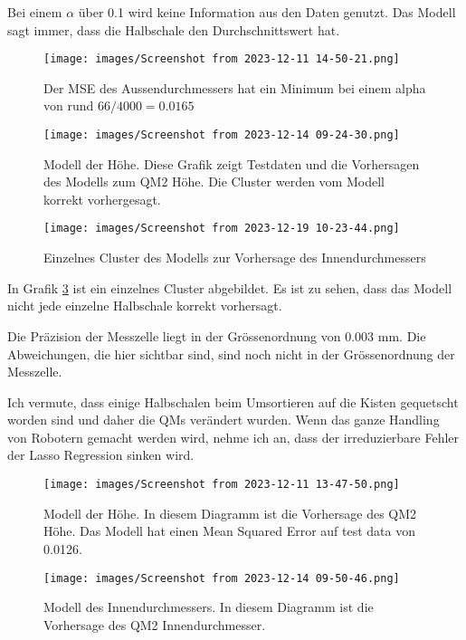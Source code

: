 Bei einem $\alpha$ über 0.1 wird keine Information aus den Daten genutzt. Das Modell sagt immer, dass die Halbschale den Durchschnittswert hat.

 
 \begin{figure} 
   
  \texttt{[image: images/Screenshot from 2023-12-11 14-50-21.png]}
  \caption{Der MSE des Aussendurchmessers hat ein Minimum bei einem alpha von rund  $66 / 4000 = 0.0165$}
  \label{fig:CVAlpha}
  \end{figure}


\begin{figure} 
   
  \texttt{[image: images/Screenshot from 2023-12-14 09-24-30.png]}
  \caption{Modell der Höhe. Diese Grafik zeigt Testdaten und die Vorhersagen des Modells zum QM2 Höhe. Die Cluster werden vom Modell korrekt vorhergesagt.}
  \label{fig:VH}
\end{figure}


\begin{figure} 
   
  \texttt{[image: images/Screenshot from 2023-12-19 10-23-44.png]}
  \caption{Einzelnes Cluster des Modells zur Vorhersage des Innendurchmessers}
  \label{fig:ClustI}
\end{figure}

In Grafik \ref{fig:ClustI} ist ein einzelnes Cluster abgebildet. Es ist zu sehen, dass das Modell nicht jede einzelne Halbschale korrekt vorhersagt.

Die Präzision der Messzelle liegt in der Grössenordnung von 0.003 mm. Die Abweichungen, die hier sichtbar sind, sind noch nicht in der Grössenordnung der Messzelle.

Ich vermute, dass einige Halbschalen beim Umsortieren auf die Kisten gequetscht worden sind und daher die QMs verändert wurden. Wenn das ganze Handling von Robotern gemacht werden wird, nehme ich an, dass der irreduzierbare Fehler der Lasso Regression sinken wird.

\begin{figure} 
   
  \texttt{[image: images/Screenshot from 2023-12-11 13-47-50.png]}
  \caption{Modell der Höhe. In diesem Diagramm ist die Vorhersage des QM2 Höhe. Das Modell hat einen Mean Squared Error auf test data von 0.0126.}
  \label{fig:}
\end{figure}


\begin{figure} 
   
  \texttt{[image: images/Screenshot from 2023-12-14 09-50-46.png]}
  \caption{Modell des Innendurchmessers. In diesem Diagramm ist die Vorhersage des QM2 Innendurchmesser.}
  \label{fig:VI}
\end{figure}


